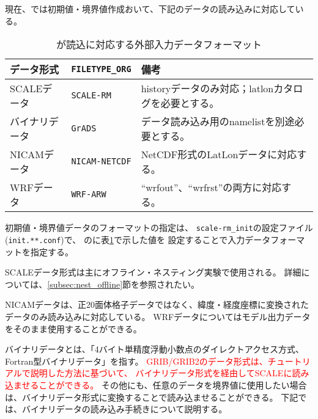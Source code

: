 \section{\SecAdvanceInputDataSetting} \label{sec:adv_datainput}

現在、\scalerm では初期値・境界値作成おいて、下記のデータの読み込みに対応している。

\begin{table}[htb]
\begin{center}
\caption{\scalelib が読込に対応する外部入力データフォーマット}
\begin{tabularx}{150mm}{|l|l|X|} \hline
 \rowcolor[gray]{0.9} データ形式      & \verb|FILETYPE_ORG|  & 備考 \\ \hline
 SCALEデータ    & \verb|SCALE-RM|     & historyデータのみ対応；latlonカタログを必要とする。 \\ \hline
 バイナリデータ & \verb|GrADS|        & データ読み込み用のnamelistを別途必要とする。 \\ \hline
 NICAMデータ    & \verb|NICAM-NETCDF| & NetCDF形式のLatLonデータに対応する。 \\ \hline
 WRFデータ      & \verb|WRF-ARW|      & ``wrfout''、``wrfrst''の両方に対応する。 \\ \hline
\end{tabularx}
\label{tab:inputdata_format}
\end{center}
\end{table}


初期値・境界値データのフォーマットの指定は、
\verb|scale-rm_init|の設定ファイル(\verb|init.**.conf|)で、
のに表\ref{tab:inputdata_format}で示した値を
設定することで入力データフォーマットを指定する。

SCALEデータ形式は主にオフライン・ネスティング実験で使用される。
詳細については、\ref{subsec:nest_offline}節を参照されたい。

NICAMデータは、正20面体格子データではなく、緯度・経度座標に変換されたデータのみ読み込みに対応している。
WRFデータについてはモデル出力データをそのまま使用することができる。

バイナリデータとは、「4バイト単精度浮動小数点のダイレクトアクセス方式、Fortran型バイナリデータ」を指す。
\textcolor{red}{GRIB/GRIB2のデータ形式は、チュートリアルで説明した方法に基づいて、
バイナリデータ形式を経由してSCALEに読み込ませることができる。}
その他にも、任意のデータを境界値に使用したい場合は、バイナリデータ形式に変換することで読み込ませることができる。
下記では、バイナリデータの読み込み手続きについて説明する。

